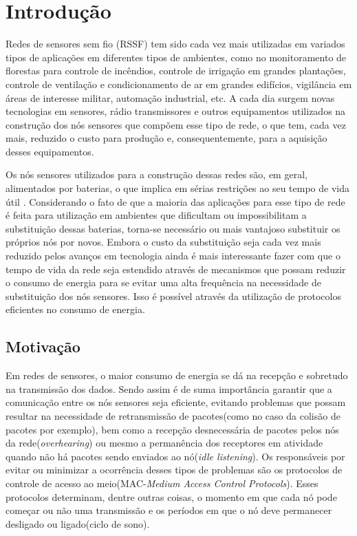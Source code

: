 \section{Introdução}

Redes de sensores sem fio (RSSF) tem sido cada vez mais utilizadas em variados tipos de aplicações em diferentes tipos de ambientes, como no monitoramento de florestas para controle de incêndios, controle de irrigação em grandes plantações, controle de ventilação e condicionamento de ar em grandes edifícios, vigilância em áreas de interesse militar, automação industrial, etc. A cada dia surgem novas tecnologias em sensores, rádio transmissores e outros equipamentos utilizados na construção dos nós sensores que compõem esse tipo de rede, o que tem, cada vez mais, reduzido o custo para produção e, consequentemente, para a aquisição desses equipamentos.

Os nós sensores utilizados para a construção dessas redes são, em geral, alimentados por baterias, o que implica em sérias restrições ao seu tempo de vida útil \cite{Akyildiz2002a}. Considerando o fato de que a maioria das aplicações para esse tipo de rede é feita para utilização em ambientes que dificultam ou impossibilitam a substituição dessas baterias, torna-se necessário ou mais vantajoso substituir os próprios nós por novos. Embora o custo da substituição seja cada vez mais reduzido pelos avanços em tecnologia ainda é mais interessante fazer com que o tempo de vida da rede seja estendido através de mecanismos que possam reduzir o consumo de energia para se evitar uma alta frequência na necessidade de substituição dos nós sensores. Isso é possível através da utilização de protocolos eficientes no consumo de energia. 

\subsection{Motivação}

Em redes de sensores, o maior consumo de energia se dá na recepção e sobretudo na transmissão dos dados. Sendo assim é de suma importância garantir que a comunicação entre os nós sensores seja eficiente, evitando problemas que possam resultar na necessidade de retransmissão de pacotes(como no caso da colisão de pacotes por exemplo), bem como a recepção desnecessária de pacotes pelos nós da rede(\emph{overhearing}) ou mesmo a permanência dos receptores em atividade quando não há pacotes sendo enviados ao nó(\emph{idle listening}). Os responsáveis por evitar ou minimizar a ocorrência desses tipos de problemas são os protocolos de controle de acesso ao meio(MAC-\emph{Medium Access Control Protocols}). Esses protocolos determinam, dentre outras coisas, o momento em que cada nó pode começar ou não uma transmissão e os períodos em que o nó deve permanecer desligado ou ligado(ciclo de sono).

